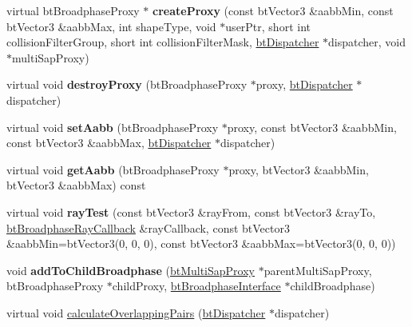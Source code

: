 \begin{DoxyCompactItemize}
virtual bt\+Broadphase\+Proxy $\ast$ {\bfseries create\+Proxy} (const bt\+Vector3 \&aabb\+Min, const bt\+Vector3 \&aabb\+Max, int shape\+Type, void $\ast$user\+Ptr, short int collision\+Filter\+Group, short int collision\+Filter\+Mask, \hyperlink{classbtDispatcher}{bt\+Dispatcher} $\ast$dispatcher, void $\ast$multi\+Sap\+Proxy)
\item 
\mbox{\label{classbtMultiSapBroadphase_a94af52a6aa0de2a2f82929f1dd1e710a}} 
virtual void {\bfseries destroy\+Proxy} (bt\+Broadphase\+Proxy $\ast$proxy, \hyperlink{classbtDispatcher}{bt\+Dispatcher} $\ast$dispatcher)
\item 
\mbox{\label{classbtMultiSapBroadphase_aa834721b348d1d085ea1cd6bfc82eaa7}} 
virtual void {\bfseries set\+Aabb} (bt\+Broadphase\+Proxy $\ast$proxy, const bt\+Vector3 \&aabb\+Min, const bt\+Vector3 \&aabb\+Max, \hyperlink{classbtDispatcher}{bt\+Dispatcher} $\ast$dispatcher)
\item 
\mbox{\label{classbtMultiSapBroadphase_ada5f9bcbfbbbbbdcc99cf2534d30b884}} 
virtual void {\bfseries get\+Aabb} (bt\+Broadphase\+Proxy $\ast$proxy, bt\+Vector3 \&aabb\+Min, bt\+Vector3 \&aabb\+Max) const
\item 
\mbox{\label{classbtMultiSapBroadphase_a45da6d35c74da589682a38fbf658b0df}} 
virtual void {\bfseries ray\+Test} (const bt\+Vector3 \&ray\+From, const bt\+Vector3 \&ray\+To, \hyperlink{structbtBroadphaseRayCallback}{bt\+Broadphase\+Ray\+Callback} \&ray\+Callback, const bt\+Vector3 \&aabb\+Min=bt\+Vector3(0, 0, 0), const bt\+Vector3 \&aabb\+Max=bt\+Vector3(0, 0, 0))
\item 
\mbox{\label{classbtMultiSapBroadphase_a96ca3208c2bf2610ce76a168f7bb62c5}} 
void {\bfseries add\+To\+Child\+Broadphase} (\hyperlink{structbtMultiSapBroadphase_1_1btMultiSapProxy}{bt\+Multi\+Sap\+Proxy} $\ast$parent\+Multi\+Sap\+Proxy, bt\+Broadphase\+Proxy $\ast$child\+Proxy, \hyperlink{classbtBroadphaseInterface}{bt\+Broadphase\+Interface} $\ast$child\+Broadphase)
\item 
\mbox{\label{classbtMultiSapBroadphase_a20c5a5d19d80b89b10a443ccb38602ee}} 
virtual void \hyperlink{classbtMultiSapBroadphase_a20c5a5d19d80b89b10a443ccb38602ee}{calculate\+Overlapping\+Pairs} (\hyperlink{classbtDispatcher}{bt\+Dispatcher} $\ast$dispatcher)

\end{DoxyCompactItemize}
